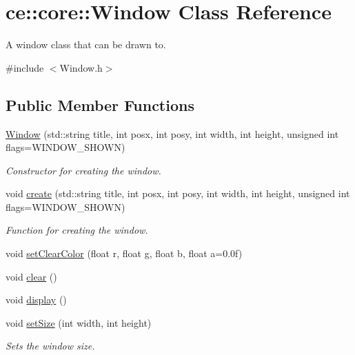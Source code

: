 \hypertarget{classce_1_1core_1_1_window}{}\section{ce\+:\+:core\+:\+:Window Class Reference}
\label{classce_1_1core_1_1_window}


A window class that can be drawn to.  




{\ttfamily \#include $<$Window.\+h$>$}

\subsection*{Public Member Functions}
\begin{DoxyCompactItemize}
\item 
\hyperlink{classce_1_1core_1_1_window_a01f1749caa5bb182410a5abcd65e9528}{Window} (std\+::string title, int posx, int posy, int width, int height, unsigned int flags=W\+I\+N\+D\+O\+W\+\_\+\+S\+H\+O\+WN)
\begin{DoxyCompactList}\small\item\em Constructor for creating the window. \end{DoxyCompactList}\item 
void \hyperlink{classce_1_1core_1_1_window_a4bdfb3cf6986e6144546cdfeb4c19e6e}{create} (std\+::string title, int posx, int posy, int width, int height, unsigned int flags=W\+I\+N\+D\+O\+W\+\_\+\+S\+H\+O\+WN)
\begin{DoxyCompactList}\small\item\em Function for creating the window. \end{DoxyCompactList}\item 
void \hyperlink{classce_1_1core_1_1_window_a48c120ae2d7e03c6839747065eeeb7be}{set\+Clear\+Color} (float r, float g, float b, float a=0.\+0f)
\item 
void \hyperlink{classce_1_1core_1_1_window_ab47b3b317acbf0ba71f4e56bd2313f0d}{clear} ()
\item 
void \hyperlink{classce_1_1core_1_1_window_a9ec120e3e9031f86acaf5ac350a8b5e4}{display} ()
\item 
void \hyperlink{classce_1_1core_1_1_window_a105a93cc62e222c99411b3184b70d84a}{set\+Size} (int width, int height)
\begin{DoxyCompactList}\small\item\em Sets the window size. \end{DoxyCompactList}\item 

\end{DoxyCompactItemize}
